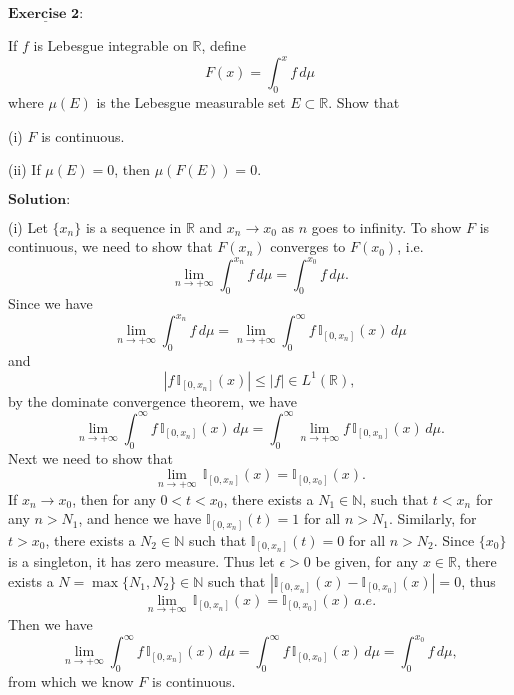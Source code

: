 \documentclass[12pt,a4paper]{ctexart}
\begin{document}
$\underline{\textbf{Exercise 2:}}$

If $f$ is Lebesgue integrable on $\mathbb{R}$, define
\begin{equation*}
    F(x) = \int_{0}^{x} f \, d \mu
\end{equation*}
where $\mu(E)$ is the Lebesgue measurable set $E \subset \mathbb{R}$. Show that

(i) $F$ is continuous.

(ii) If $\mu(E) = 0$, then $\mu(F(E)) = 0$. 
 

\vspace{8pt}
$\textbf{Solution:}$

(i) Let $\{x_{n}\}$ is a sequence in $\mathbb R$ and $x_{n} \to x_{0}$ as $n$ goes to infinity. To show $F$ is continuous, we need to show that $F(x_{n})$ converges to $F(x_{0})$, i.e.
\begin{equation*}
    \lim_{n \to + \infty} \int_{0}^{x_{n}} f \, d \mu = \int_{0}^{x_{0}} f \, d \mu.
\end{equation*}
Since we have
\begin{equation*}
    \lim_{n \to + \infty} \int_{0}^{x_{n}} f \, d \mu = \lim_{n \to + \infty} \int_{0}^{\infty} f \, \mathbb{I}_{[0, x_{n}]} (x) \, d \mu
\end{equation*}
and
\begin{equation*}
    |f \, \mathbb{I}_{[0, x_{n}]} (x) | \leq |f| \in L^{1}(\mathbb{R}),
\end{equation*}
by the dominate convergence theorem, we have
\begin{equation*}
     \lim_{n \to + \infty} \int_{0}^{\infty} f \, \mathbb{I}_{[0, x_{n}]} (x) \, d \mu =  \int_{0}^{\infty}  \lim_{n \to + \infty} f \, \mathbb{I}_{[0, x_{n}]} (x) \, d \mu.
\end{equation*}
Next we need to show that
\begin{equation*}
    \lim_{n \to + \infty} \, \mathbb{I}_{[0, x_{n}]} (x) = \mathbb{I}_{[0, x_{0}]} (x).
\end{equation*}
If $x_{n} \to x_{0}$, then for any $0 < t < x_{0}$, there exists a $N_{1} \in \mathbb{N}$, such that $t < x_{n}$ for any $n > N_{1}$, and hence we have $\mathbb{I}_{[0, x_{n}]} (t) = 1$ for all $n > N_{1}$. Similarly, for $t > x_{0}$, there exists a $N_{2} \in \mathbb{N}$ such that $\mathbb{I}_{[0, x_{n}]} (t) = 0$ for all $n > N_{2}$. Since $\{x_{0}\}$ is a singleton, it has zero measure. Thus let $\epsilon > 0$ be given, for any $x \in \mathbb R$, there exists a $N = \max \{ N_1, N_2 \} \in \mathbb N$ such that $|\mathbb I_{[0, x_n]}(x) - \mathbb I_{[0,x_0]} (x) | = 0$, thus
\begin{equation*}
    \lim_{n \to + \infty} \, \mathbb{I}_{[0, x_{n}]} (x) = \mathbb{I}_{[0, x_{0}]} (x) \, a.e.
\end{equation*}
Then we have
\begin{equation*}
     \lim_{n \to + \infty} \int_{0}^{\infty} f \, \mathbb{I}_{[0, x_{n}]} (x) \, d \mu =  \int_{0}^{\infty} f \, \mathbb{I}_{[0, x_{0}]} (x) \, d \mu = \int_{0}^{x_{0}} f \, d \mu,
\end{equation*}
from which we know $F$ is continuous.
\end{document}

